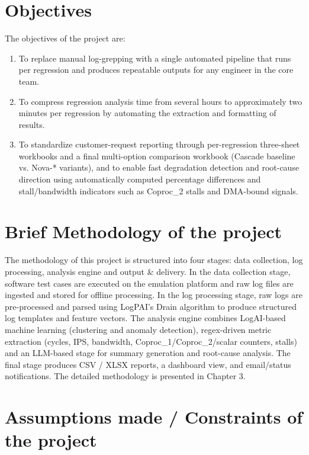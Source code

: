 \section[Objectives]{\textbf{Objectives}}
The objectives of the project are:
\begin{enumerate}
\item To replace manual log-grepping with a single automated pipeline that runs per regression and produces repeatable outputs for any engineer in the core team.
\item To compress regression analysis time from several hours to approximately two minutes per regression by automating the extraction and formatting of results.
\item To standardize customer-request reporting through per-regression three-sheet workbooks and a final multi-option comparison workbook (Cascade baseline vs. Nova-* variants), and to enable fast degradation detection and root-cause direction using automatically computed percentage differences and stall/bandwidth indicators such as Coproc\_2 stalls and DMA-bound signals.
\end{enumerate}

\section[Brief Methodology of the project]{\textbf{Brief Methodology of the project}}
The methodology of this project is structured into four stages: data collection, log processing, analysis engine and output \& delivery. In the data collection stage, software test cases are executed on the emulation platform and raw log files are ingested and stored for offline processing. In the log processing stage, raw logs are pre-processed and parsed using LogPAI's Drain algorithm to produce structured log templates and feature vectors. The analysis engine combines LogAI-based machine learning (clustering and anomaly detection), regex-driven metric extraction (cycles, IPS, bandwidth, Coproc\_1/Coproc\_2/scalar counters, stalls) and an LLM-based stage for summary generation and root-cause analysis. The final stage produces CSV / XLSX reports, a dashboard view, and email/status notifications. The detailed methodology is presented in Chapter 3.

\section[Assumptions made / Constraints of the project]{\textbf{Assumptions made / Constraints of the project}}


